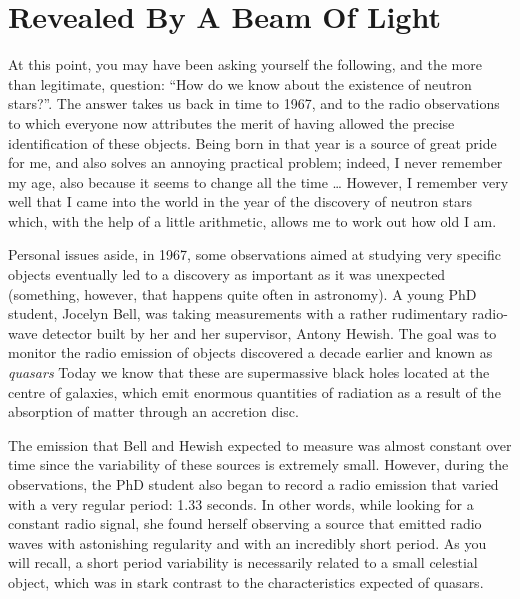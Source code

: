 \section{Revealed By A Beam Of Light}\label{sec:05-pulsars}

At this point, you may have been asking yourself the following, and the more than
legitimate, question: ``How do we know about the existence of neutron stars?''. The
answer takes us back in time to 1967, and to the radio observations to which everyone
now attributes the merit of having allowed the precise identification of these objects.
Being born in that year is a source of great pride for me, and also solves an annoying
practical problem; indeed, I never remember my age, also because it seems to change all
the time \ldots{} However, I remember very well that I came into the world in the year
of the discovery of neutron stars which, with the help of a little arithmetic, allows me
to work out how old I am.

Personal issues aside, in 1967, some observations aimed at studying very specific
objects eventually led to a discovery as important as it was unexpected (something,
however, that happens quite often in astronomy). A young PhD student, Jocelyn Bell, was
taking measurements with a rather rudimentary radio-wave detector built by her and her
supervisor, Antony Hewish. The goal was to monitor the radio emission
of objects discovered a decade earlier and known as \emph{quasars}
Today we know that these are supermassive black holes located at the
centre of galaxies, which emit enormous quantities of radiation as a result of the
absorption of matter through an accretion disc.

The emission that Bell and Hewish expected to measure was almost
constant over time since the variability of these sources is
extremely small. However, during the observations, the PhD student also began to record
a radio emission that varied with a very regular period: 1.33 seconds. In other words,
while looking for a constant radio signal, she found herself observing a source that
emitted radio waves with astonishing regularity and with an
incredibly short period. As you will recall, a short period variability is necessarily
related to a small celestial object, which was in stark contrast to the characteristics
expected of quasars.

